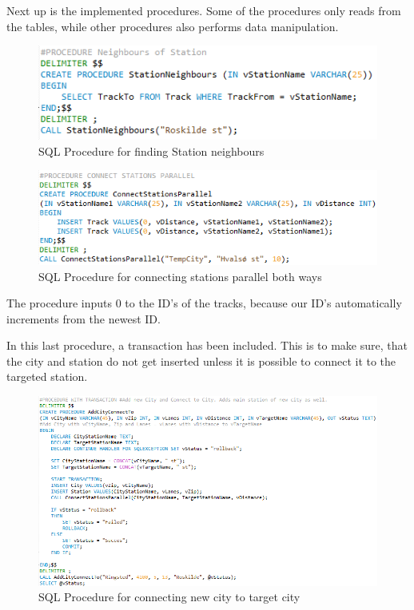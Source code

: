 Next up is the implemented procedures. Some of the procedures only reads from 
the tables, while other procedures also performs data manipulation.

\begin{figure}[ht!]
    \centering
    \includegraphics[width=1\textwidth]{img/SQL_PROCEDURE_Neighbours}
    \caption{SQL Procedure for finding Station neighbours}
\end{figure}

\begin{figure}[ht!]
    \centering
    \includegraphics[width=1\textwidth]{img/SQL_PROCEDURE_ConnectParallel}
    \caption{SQL Procedure for connecting stations parallel both ways}
\end{figure}

The procedure inputs 0 to the ID's of the tracks, because our ID's 
automatically increments from the newest ID.

In this last procedure, a transaction has been included. This is to make sure, 
that the city and station do not get inserted unless it is possible to connect 
it to the targeted station.

\begin{figure}[ht!]
    \centering
    \includegraphics[width=1\textwidth]{img/SQL_PROCEDURE_AddCityConnect}
    \caption{SQL Procedure for connecting new city to target city}
\end{figure}

